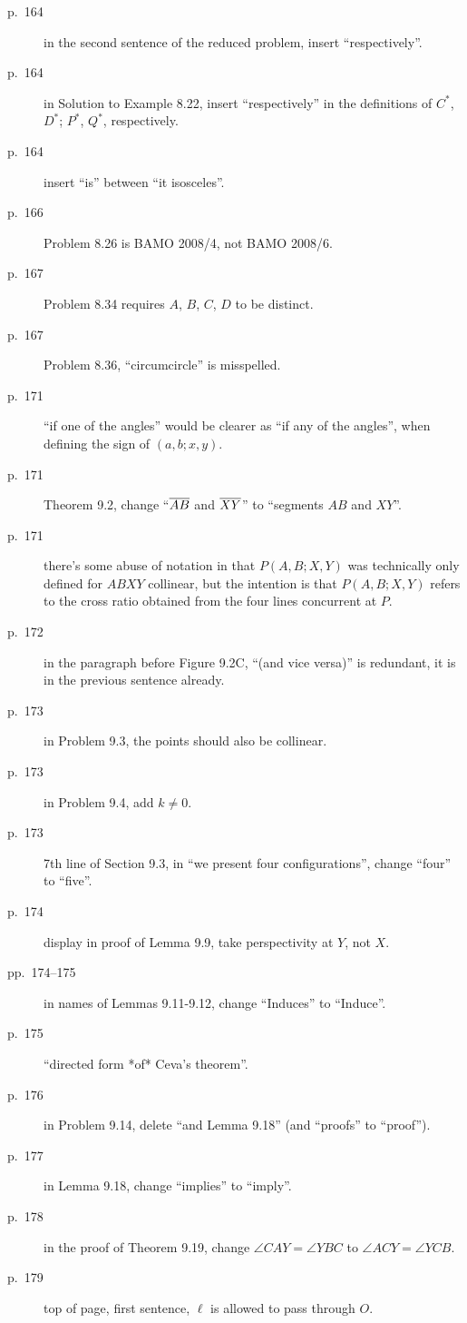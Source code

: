 \documentclass[11pt]{scrartcl}
\begin{document}
\begin{description}
\item[p.\  164] in the second sentence of the reduced problem, insert ``respectively''.
\item[p.\  164] in Solution to Example 8.22, insert ``respectively''
  in the definitions of $C^\ast$, $D^\ast$; $P^\ast$, $Q^\ast$, respectively.
\item[p.\  164] insert ``is'' between ``it isosceles''.
\item[p.\  166] Problem 8.26 is BAMO 2008/4, not BAMO 2008/6.
\item[p.\  167] Problem 8.34 requires $A$, $B$, $C$, $D$ to be distinct.
\item[p.\  167] Problem 8.36, ``circumcircle'' is misspelled.
\item[p.\  171] ``if one of the angles'' would be clearer as ``if any of the
  angles'', when defining the sign of $(a,b;x,y)$.
\item[p.\  171] Theorem 9.2, change ``$\overline{AB}$ and $\overline{XY}$'' to ``segments $AB$ and $XY$''.
\item[p.\  171] there's some abuse of notation in that $P(A,B;X,Y)$
  was technically only defined for $ABXY$ collinear,
  but the intention is that $P(A,B;X,Y)$ refers to the cross ratio obtained
  from the four lines concurrent at $P$.
\item[p.\  172] in the paragraph before Figure 9.2C,
  ``(and vice versa)'' is redundant, it is in the previous sentence already.
\item[p.\  173] in Problem 9.3, the points should also be collinear.
\item[p.\  173] in Problem 9.4, add $k \neq 0$.
\item[p.\  173] 7th line of Section 9.3, in ``we present four configurations'',
  change ``four'' to ``five''.
\item[p.\  174] display in proof of Lemma 9.9, take perspectivity at $Y$, not $X$.
\item[pp.\  174--175] in names of Lemmas 9.11-9.12,
  change ``Induces'' to ``Induce''.
\item[p.\  175] ``directed form *of* Ceva's theorem''.
\item[p.\  176] in Problem 9.14, delete ``and Lemma 9.18'' (and ``proofs'' to ``proof'').
\item[p.\  177] in Lemma 9.18, change ``implies'' to ``imply''.
\item[p.\  178] in the proof of Theorem 9.19, change $\angle CAY = \angle YBC$ to $\angle ACY = \angle YCB$.
\item[p.\  179] top of page, first sentence, $\ell$ is allowed to pass through $O$.

\end{description}
\end{document}
